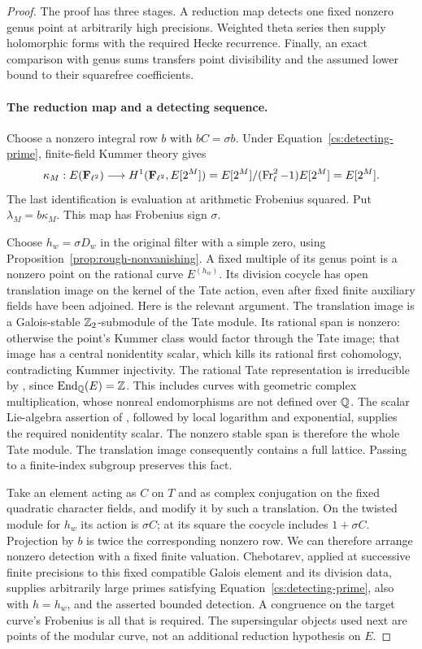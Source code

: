 \begin{proof}
The proof has three stages. A reduction map detects one fixed nonzero
genus point at arbitrarily high precisions. Weighted theta series then
supply holomorphic forms with the required Hecke recurrence. Finally,
an exact comparison with genus sums transfers point divisibility and
the assumed lower bound to their squarefree coefficients.

\paragraph{The reduction map and a detecting sequence.}
Choose a nonzero integral row $b$ with $bC=\sigma b$.  Under
Equation~\eqref{cs:detecting-prime}, finite-field Kummer theory gives
\[
 \kappa_M:E(\mathbf F_{\ell^2})\longrightarrow
 H^1(\mathbf F_{\ell^2},E[2^M])
       =E[2^M]/(\operatorname{Fr}_\ell^2-1)E[2^M]=E[2^M].
\]
The last identification is evaluation at arithmetic Frobenius squared.
Put $\lambda_M=b\kappa_M$.  This map has Frobenius sign $\sigma$.

Choose $h_w=\sigma D_w$ in the original filter with a simple zero,
using Proposition~\ref{prop:rough-nonvanishing}.  A fixed multiple of
its genus point is a nonzero point on the rational curve $E^{(h_w)}$.
Its division cocycle has open translation image on the kernel of the
Tate action, even after fixed finite auxiliary fields have been
adjoined.  Here is the relevant argument.  The translation image is a
Galois-stable $\mathbb Z_2$-submodule of the Tate module.  Its rational span is
nonzero: otherwise the point's Kummer class would factor through the
Tate image; that image has a central nonidentity scalar, which kills
its rational first cohomology, contradicting Kummer injectivity.
The rational Tate representation is irreducible by
\citet[Chapter~IV, Section~2.1, pp.~IV-9--IV-10]{Serre1968}, since
$\operatorname{End}_{\mathbb Q}(E)=\mathbb Z$.  This includes curves with geometric
complex multiplication, whose nonreal endomorphisms are not defined
over $\mathbb Q$.  The scalar Lie-algebra assertion of
\citet[Section~2, Theorem~3, p.~62]{Bogomolov1981}, followed by local
logarithm and exponential, supplies the required nonidentity scalar.
The nonzero stable span is therefore the whole Tate module.  The
translation image consequently contains a full lattice.  Passing to
a finite-index subgroup preserves this fact.

Take an element acting as $C$ on $T$ and as complex conjugation on the
fixed quadratic character fields, and modify it by such a translation.
On the twisted module for $h_w$ its action is $\sigma C$; at its square
the cocycle includes $1+\sigma C$.  Projection by $b$ is twice the
corresponding nonzero row.  We can therefore arrange nonzero detection
with a fixed finite valuation.  Chebotarev, applied at successive finite
precisions to this fixed compatible Galois element and its division
data, supplies arbitrarily large primes satisfying
Equation~\eqref{cs:detecting-prime}, also with $h=h_w$, and the asserted
bounded detection.  A congruence on the target curve's Frobenius is all
that is required.  The supersingular objects used next are points of
the modular curve, not an additional reduction hypothesis on $E$.


\end{proof}
